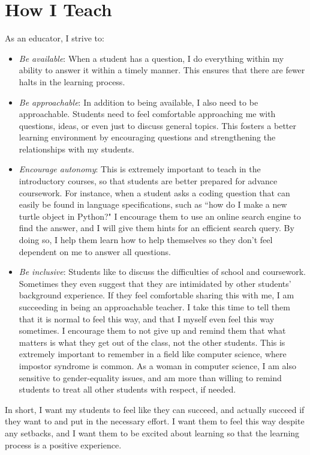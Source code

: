 \documentclass[12pt]{amsart} \usepackage{amssymb}
\begin{document}
\section*{How I Teach}
\noindent As an educator, I strive to:
\begin{itemize}
\item \emph{Be available}: When a student has a question, I do everything within my ability to answer it within a timely manner. This ensures that there are fewer halts in the learning process.\vspace{2mm}
\item \emph{Be approachable}: In addition to being available, I also need to be approachable. Students need to feel comfortable approaching me with questions, ideas, or even just to discuss general topics. This fosters a better learning environment by encouraging questions and strengthening the relationships with my students.\vspace{2mm}
\item \emph{Encourage autonomy}: This is extremely important to teach in the introductory courses, so that students are better prepared for advance coursework. For instance, when a student asks a coding question that can easily be found in language specifications, such as ``how do I make a new turtle object in Python?" I encourage them to use an online search engine to find the answer, and I will give them hints for an efficient search query. By doing so, I help them learn how to help themselves so they don’t feel dependent on me to answer all questions. \vspace{2mm}
\newpage
\item \emph{Be inclusive}: Students like to discuss the difficulties of school and coursework. Sometimes they even suggest that they are intimidated by other students’ background experience. If they feel comfortable sharing this with me, I am succeeding in being an approachable teacher. I take this time to tell them that it is normal to feel this way, and that I myself even feel this way sometimes. I encourage them to not give up and remind them that what matters is what they get out of the class, not the other students. This is extremely important to remember in a field like computer science, where impostor syndrome is common. As a woman in computer science, I am also sensitive to gender-equality issues, and am more than willing to remind students to treat all other students with respect, if needed.\vspace{2mm}
\end{itemize}
In short, I want my students to feel like they can succeed, and actually succeed if they want to and put in the necessary effort. I want them to feel this way despite any setbacks, and I want them to be excited about learning so that the learning process is a positive experience.
\end{document}
